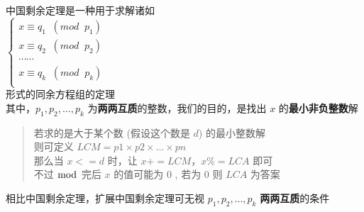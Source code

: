 \documentclass[E:/GsjzTle/main/main.tex]{subfiles}
\begin{document}
中国剩余定理是一种用于求解诸如\\
\(\begin{cases}x≡q_1\;\;(mod\;\;p_1)\\x≡q_2\;\;(mod\;\;p_2)\\ \cdots \cdots\\x≡q_k\;\;(mod\;\;p_k)\\\end{cases}\)\\
形式的同余方程组的定理\\
其中，\(p_1,p_2,...,p_k\) 为\textbf{两两互质}的整数，我们的目的，是找出
\(x\) 的\textbf{最小非负整数}解

\begin{quote}
若求的是大于某个数 (假设这个数是 \(d\)) 的最小整数解\\
则可定义 \(LCM = p1\times p2\times ... \times pn\)\\
那么当 \(x <= d\) 时，让 \(x += LCM\)，\(x\%=LCA\) 即可\\
不过 \(\bmod\) 完后 \(x\) 的值可能为 \(0\) , 若为 \(0\) 则 \(LCA\)
为答案
\end{quote}

相比中国剩余定理，扩展中国剩余定理可无视 \(p_1,p_2,...,p_k\)
\textbf{两两互质}的条件
\end{document}
